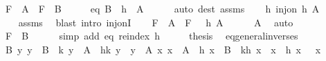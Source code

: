 \begin{isabellebody}
\ \ \ {\isachardoublequoteopen}F\ {\isasymphi}\ A\ {\isacharequal}{\kern0pt}\ F\ {\isasymgamma}\ B{\isachardoublequoteclose}\isanewline
%
\isadelimproof
%
\endisadelimproof
%
\isatagproof
{}\isamarkupfalse%
\ {\isacharminus}{\kern0pt}\isanewline
\ \ \isamarkupfalse%
\ eq{\isacharcolon}{\kern0pt}\ {\isachardoublequoteopen}B\ {\isacharequal}{\kern0pt}\ h\ {\isacharbackquote}{\kern0pt}\ A{\isachardoublequoteclose}\isanewline
\ \ \ \ \isamarkupfalse%
\ {\isacharparenleft}{\kern0pt}auto\ dest{\isacharcolon}{\kern0pt}\ assms{\isacharparenright}{\kern0pt}\isanewline
\ \ \isamarkupfalse%
\ h{\isacharcolon}{\kern0pt}\ {\isachardoublequoteopen}inj{\isacharunderscore}{\kern0pt}on\ h\ A{\isachardoublequoteclose}\isanewline
\ \ \ \ \isamarkupfalse%
\ assms\ \isamarkupfalse%
\ {\isacharparenleft}{\kern0pt}blast\ intro{\isacharcolon}{\kern0pt}\ inj{\isacharunderscore}{\kern0pt}onI{\isacharparenright}{\kern0pt}\isanewline
\ \ \isamarkupfalse%
\ {\isachardoublequoteopen}F\ {\isasymphi}\ A\ {\isacharequal}{\kern0pt}\ F\ {\isacharparenleft}{\kern0pt}{\isasymgamma}\ {\isasymcirc}\ h{\isacharparenright}{\kern0pt}\ A{\isachardoublequoteclose}\isanewline
\ \ \ \ \isamarkupfalse%
\ A\ \isamarkupfalse%
\ auto\isanewline
\ \ \isamarkupfalse%
\ \isamarkupfalse%
\ {\isachardoublequoteopen}{\isasymdots}\ {\isacharequal}{\kern0pt}\ F\ {\isasymgamma}\ B{\isachardoublequoteclose}\isanewline
\ \ \ \ \isamarkupfalse%
\ {\isacharparenleft}{\kern0pt}simp\ add{\isacharcolon}{\kern0pt}\ eq\ reindex\ h{\isacharparenright}{\kern0pt}\isanewline
\ \ \isamarkupfalse%
\ \isamarkupfalse%
\ {\isacharquery}{\kern0pt}thesis\ \isacommand{{\isachardot}{\kern0pt}}\isamarkupfalse%
\isanewline
{}\isamarkupfalse%
%
\endisatagproof
{\isafoldproof}%
%
\isadelimproof
\isanewline
%
\endisadelimproof
\isanewline
{}\isamarkupfalse%
\ eq{\isacharunderscore}{\kern0pt}general{\isacharunderscore}{\kern0pt}inverses{\isacharcolon}{\kern0pt}\isanewline
\ \ \ B{\isacharcolon}{\kern0pt}\ {\isachardoublequoteopen}{\isasymAnd}y{\isachardot}{\kern0pt}\ y\ {\isasymin}\ B\ {\isasymLongrightarrow}\ k\ y\ {\isasymin}\ A\ {\isasymand}\ h{\isacharparenleft}{\kern0pt}k\ y{\isacharparenright}{\kern0pt}\ {\isacharequal}{\kern0pt}\ y{\isachardoublequoteclose}\ \ A{\isacharcolon}{\kern0pt}\ {\isachardoublequoteopen}{\isasymAnd}x{\isachardot}{\kern0pt}\ x\ {\isasymin}\ A\ {\isasymLongrightarrow}\ h\ x\ {\isasymin}\ B\ {\isasymand}\ k{\isacharparenleft}{\kern0pt}h\ x{\isacharparenright}{\kern0pt}\ {\isacharequal}{\kern0pt}\ x\ {\isasymand}\ {\isasymgamma}{\isacharparenleft}{\kern0pt}h\ x{\isacharparenright}{\kern0pt}\ {\isacharequal}{\kern0pt}\ {\isasymphi}\ x{\isachardoublequoteclose}\isanewline

\end{isabellebody}
